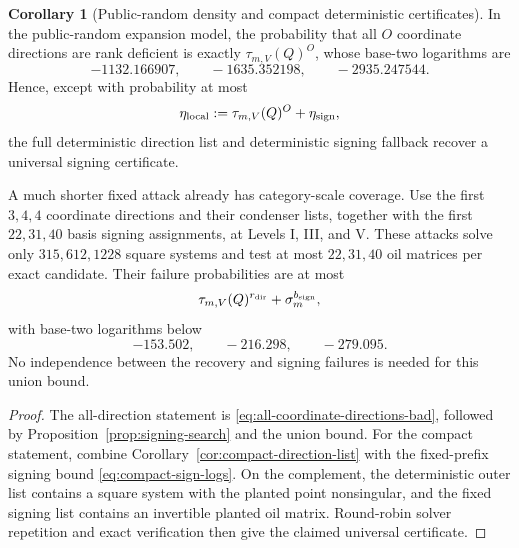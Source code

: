 \documentclass[11pt,a4paper]{article}
\theoremstyle{definition}
\newtheorem{corollary}[theorem]{Corollary}
\theoremstyle{remark}
\begin{document}
\begin{corollary}[Public-random density and compact deterministic certificates]\label{cor:graph-ideal-recovery}
In the public-random expansion model, the probability that all $O$ coordinate directions are rank deficient is exactly $\tau_{m,V}(Q)^O$, whose base-two logarithms are
\[
 -1132.166907,\qquad-1635.352198,\qquad-2935.247544.
\]
Hence, except with probability at most
\begin{equation}\label{eq:eta-local-functional}
 \eta_{\rm local}:=\tau_{m,V}(Q)^O+\eta_{\rm sign},
\end{equation}
the full deterministic direction list and deterministic signing fallback recover a universal signing certificate.

A much shorter fixed attack already has category-scale coverage.  Use the first $3,4,4$ coordinate directions and their condenser lists, together with the first $22,31,40$ basis signing assignments, at Levels I, III, and V.  These attacks solve only $315,612,1228$ square systems and test at most $22,31,40$ oil matrices per exact candidate.  Their failure probabilities are at most
\[
 \tau_{m,V}(Q)^{r_{\rm dir}}+\sigma_m^{b_{\rm sign}},
\]
with base-two logarithms below
\begin{equation}\label{eq:compact-combined-logs}
 -153.502,\qquad-216.298,\qquad-279.095.
\end{equation}
No independence between the recovery and signing failures is needed for this union bound.
\end{corollary}

\begin{proof}
The all-direction statement is \eqref{eq:all-coordinate-directions-bad}, followed by Proposition~\ref{prop:signing-search} and the union bound.  For the compact statement, combine Corollary~\ref{cor:compact-direction-list} with the fixed-prefix signing bound \eqref{eq:compact-sign-logs}.  On the complement, the deterministic outer list contains a square system with the planted point nonsingular, and the fixed signing list contains an invertible planted oil matrix.  Round-robin solver repetition and exact verification then give the claimed universal certificate.
\end{proof}
\end{document}
